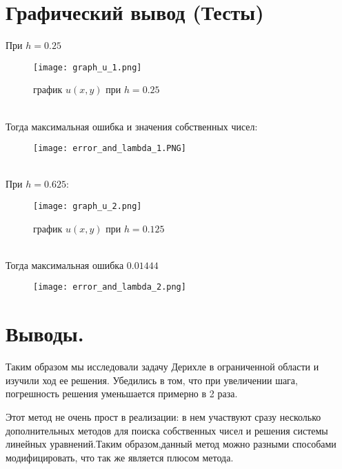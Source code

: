 \documentclass[12pt,a4paper]{scrartcl}
\begin{document}
\section{Графический вывод (Тесты)}
При $h = 0.25$ 
\begin{figure}[h]
    \centering
    \texttt{[image: graph\_u\_1.png]}
    \caption{график $u(x,y)$ при $h=0.25$}
\end{figure}
\\
Тогда максимальная ошибка и значения собственных чисел: 
\begin{figure}[h]
    \centering
    \texttt{[image: error\_and\_lambda\_1.PNG]}
\end{figure}
\\
При $h = 0.625$:
\begin{figure}[h]
    \centering
    \texttt{[image: graph\_u\_2.png]}
    \caption{график $u(x,y)$ при $h=0.125$}
\end{figure}
\\
Тогда максимальная ошибка $0.01444$
\\

\begin{figure}[h]
    \centering
    \texttt{[image: error\_and\_lambda\_2.png]}
\end{figure}

\newpage

\section{Выводы.}

Таким образом мы исследовали задачу Дерихле в ограниченной области и изучили ход ее решения. Убедились в том, что при увеличении шага, погрешность решения уменьшается примерно в 2 раза.

Этот метод не очень прост в реализации: в нем участвуют сразу несколько дополнительных методов для поиска собственных чисел и решения системы линейных уравнений.Таким образом,данный метод можно разными способами модифицировать, что так же является плюсом метода.
\end{document}
